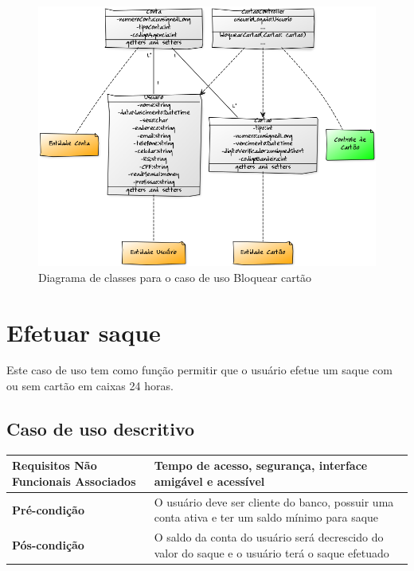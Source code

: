 \begin{figure}[!htb]
     \centering
     \includegraphics[scale=0.5]{diagramas/diagrama-de-classe/imagens/bloquearCartao.png}
     \caption{Diagrama de classes para o caso de uso Bloquear cartão}
\end{figure}

\section{Efetuar saque}

Este caso de uso tem como função permitir que o usuário efetue um saque com ou sem cartão em caixas 24 horas.

\subsection{Caso de uso descritivo}

\begin{table}[h]
  \centering
  \begin{tabular}{|p{4cm} | p{10cm} |}
      \hline
      \small{\textbf{Requisitos Não Funcionais Associados}}	& Tempo de acesso, segurança, interface amigável e acessível	\\ \hline
      \small{\textbf{Pré-condição}}	&	O usuário deve ser cliente do banco, possuir uma conta ativa e ter um saldo mínimo para saque	\\ \hline
      \small{\textbf{Pós-condição}}	&	O saldo da conta do usuário será decrescido do valor do saque e o usuário terá o saque efetuado	\\ \hline
    \end{tabular}
\end{table}


